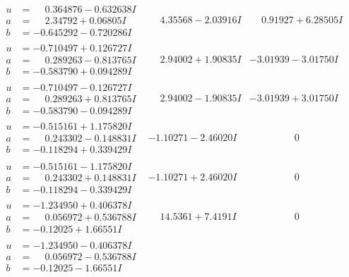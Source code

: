 \documentclass[1p]{elsarticle_modified}
\theoremstyle{definition}
\begin{document}
$$\begin{array}{c|c|c}
\begin{aligned}
u &= \phantom{-}0.364876 - 0.632638 I \\
a &= \phantom{-}2.34792 + 0.06805 I \\
b &= -0.645292 - 0.720286 I\end{aligned}
 & \phantom{-}4.35568 - 2.03916 I & \phantom{-}0.91927 + 6.28505 I \\ \hline\begin{aligned}
u &= -0.710497 + 0.126727 I \\
a &= \phantom{-}0.289263 - 0.813765 I \\
b &= -0.583790 + 0.094289 I\end{aligned}
 & \phantom{-}2.94002 + 1.90835 I & -3.01939 - 3.01750 I \\ \hline\begin{aligned}
u &= -0.710497 - 0.126727 I \\
a &= \phantom{-}0.289263 + 0.813765 I \\
b &= -0.583790 - 0.094289 I\end{aligned}
 & \phantom{-}2.94002 - 1.90835 I & -3.01939 + 3.01750 I \\ \hline\begin{aligned}
u &= -0.515161 + 1.175820 I \\
a &= \phantom{-}0.243302 - 0.148831 I \\
b &= -0.118294 + 0.339429 I\end{aligned}
 & -1.10271 - 2.46020 I & \phantom{-0.000000 } 0 \\ \hline\begin{aligned}
u &= -0.515161 - 1.175820 I \\
a &= \phantom{-}0.243302 + 0.148831 I \\
b &= -0.118294 - 0.339429 I\end{aligned}
 & -1.10271 + 2.46020 I & \phantom{-0.000000 } 0 \\ \hline\begin{aligned}
u &= -1.234950 + 0.406378 I \\
a &= \phantom{-}0.056972 + 0.536788 I \\
b &= -0.12025 + 1.66551 I\end{aligned}
 & \phantom{-}14.5361 + 7.4191 I & \phantom{-0.000000 } 0 \\ \hline\begin{aligned}
u &= -1.234950 - 0.406378 I \\
a &= \phantom{-}0.056972 - 0.536788 I \\
b &= -0.12025 - 1.66551 I\end{aligned}

\end{array}$$
\end{document}
